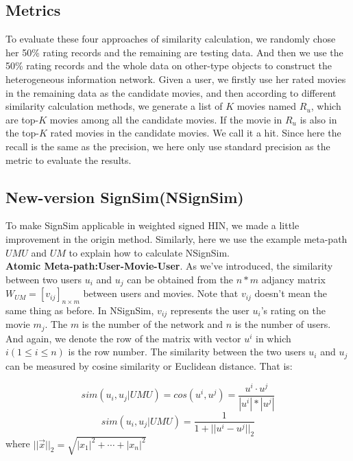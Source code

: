 \documentclass{acm_proc_article-csis8101}
\begin{document}
\subsection{Metrics}

To evaluate these four approaches of similarity calculation, we randomly chose her 50\% rating records and the remaining are testing data. And then we use the 50\% rating records and the whole data on other-type objects to construct the heterogeneous information network. Given a user, we firstly use her rated movies in the remaining data as the candidate movies, and then according to different similarity calculation methods, we generate a list of $K$ movies named $R_{u}$, which are top-$K$ movies among all the candidate movies. If the movie in $R_{u}$ is also in the top-$K$ rated movies in the candidate movies. We call it a hit. Since here the recall is the same as the precision, we here only use standard precision as the metric to evaluate the results.

\subsection{New-version SignSim(NSignSim)}

To make SignSim applicable in weighted signed HIN, we made a little improvement in the origin method. Similarly, here we use the example meta-path $UMU$ and $UM$ to explain how to calculate NSignSim.\\

\textbf{Atomic Meta-path:User-Movie-User}. As we've introduced, the similarity between two users $u_{i}$ and $u_{j}$ can be obtained from the $n*m$ adjancy matrix $W_{UM} = [v_{ij}]_{n \times m}$ between users and movies. Note that $v_{ij}$ doesn't mean the same thing as before. In NSignSim, $v_{ij}$ represents the user $u_{i}$'s rating on the movie $m_{j}$. The $m$ is the number of the network and $n$ is the number of users. And again, we denote the row of the matrix with vector $u^{i}$  in which $i(1 \leq i \leq n)$ is the row number. The similarity between the two users $u_{i}$ and $u_{j}$ can be measured by cosine similarity or Euclidean distance. That is:

\begin{equation}
sim(u_{i},u_{j}|UMU)=cos(u^{i},u^{j})=\frac{u^{i} \cdot u^{j}}{|u^{i}|*|u^{j}|}
\end{equation}
\begin{equation}
sim(u_{i},u_{j}|UMU)=\frac{1}{1+||u^{i} - u^{j}||_{2}}
\end{equation}
where $||\overrightarrow{x}||_{2} = \sqrt{|x_{1}|^{2}+ \cdots + |x_{n}|^{2}}$
\end{document}
